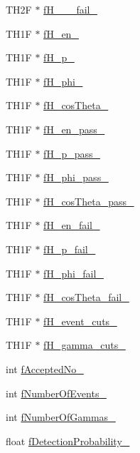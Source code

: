 \begin{DoxyCompactItemize}
\item 
T\+H2F $\ast$ \hyperlink{classPsDecay_a929f173b06a0cee44ea090f5d35d15c8}{f\+H\+\_\+\_\+\_\+fail\+\_\+}
\item 
T\+H1F $\ast$ \hyperlink{classPsDecay_a6dfa432418e7f7e49ee6635e4df80c70}{f\+H\+\_\+en\+\_\+}
\item 
T\+H1F $\ast$ \hyperlink{classPsDecay_a7dc7f2407d80e5439a397632723ed60d}{f\+H\+\_\+p\+\_\+}
\item 
T\+H1F $\ast$ \hyperlink{classPsDecay_ae501ea764ce924148fca7d6b1690c40b}{f\+H\+\_\+phi\+\_\+}
\item 
T\+H1F $\ast$ \hyperlink{classPsDecay_ac3abee8f113229cc7fc3b5c6822b08c9}{f\+H\+\_\+cos\+Theta\+\_\+}
\item 
T\+H1F $\ast$ \hyperlink{classPsDecay_a3d42050216fe2a6d43d63fd0a0a6e94a}{f\+H\+\_\+en\+\_\+pass\+\_\+}
\item 
T\+H1F $\ast$ \hyperlink{classPsDecay_a65d304f41e588f9588cb551826989dae}{f\+H\+\_\+p\+\_\+pass\+\_\+}
\item 
T\+H1F $\ast$ \hyperlink{classPsDecay_a8f1c6d7069dad26f9fab9e319e940db2}{f\+H\+\_\+phi\+\_\+pass\+\_\+}
\item 
T\+H1F $\ast$ \hyperlink{classPsDecay_aa35962b605f27e790af869e62b8e30b0}{f\+H\+\_\+cos\+Theta\+\_\+pass\+\_\+}
\item 
T\+H1F $\ast$ \hyperlink{classPsDecay_ad545f241da3ae36ce43bc082a0c71183}{f\+H\+\_\+en\+\_\+fail\+\_\+}
\item 
T\+H1F $\ast$ \hyperlink{classPsDecay_a6e4560ff2d8b93cb0654535579fef5cf}{f\+H\+\_\+p\+\_\+fail\+\_\+}
\item 
T\+H1F $\ast$ \hyperlink{classPsDecay_abb74a986a7f2115c0113b2a0702b7e80}{f\+H\+\_\+phi\+\_\+fail\+\_\+}
\item 
T\+H1F $\ast$ \hyperlink{classPsDecay_a08392542526dfd2f80ed110843b477a4}{f\+H\+\_\+cos\+Theta\+\_\+fail\+\_\+}
\item 
T\+H1F $\ast$ \hyperlink{classPsDecay_adedcdf6c1878a93c5f2c3809f6ced052}{f\+H\+\_\+event\+\_\+cuts\+\_\+}
\item 
T\+H1F $\ast$ \hyperlink{classPsDecay_aaa94c7a338ede5d9b6cfbdd5a6a72d4e}{f\+H\+\_\+gamma\+\_\+cuts\+\_\+}
\item 
int \hyperlink{classPsDecay_a87f76faf8bed97d0297fa9fc5a8058b6}{f\+Accepted\+No\+\_\+}
\item 
int \hyperlink{classPsDecay_a32e3f4712d0c7a995d0b8c959c720e79}{f\+Number\+Of\+Events\+\_\+}
\item 
int \hyperlink{classPsDecay_a7181fb08b4524a9f222bb5178e2b33b4}{f\+Number\+Of\+Gammas\+\_\+}
\item 
float \hyperlink{classPsDecay_afcd2742fdf65e1f1070294b06fc112c7}{f\+Detection\+Probability\+\_\+}
\end{DoxyCompactItemize}


